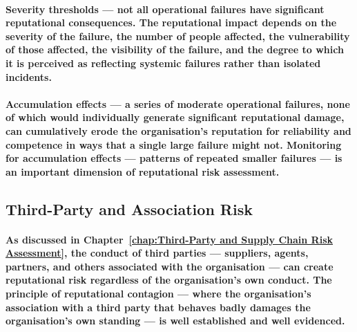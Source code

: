 \paragraph{\textbf{Severity thresholds} — not all operational failures have significant reputational consequences. The reputational impact depends on the severity of the failure, the number of people affected, the vulnerability of those affected, the visibility of the failure, and the degree to which it is perceived as reflecting systemic failures rather than isolated incidents.}
\paragraph{\textbf{Accumulation effects} — a series of moderate operational failures, none of which would individually generate significant reputational damage, can cumulatively erode the organisation's reputation for reliability and competence in ways that a single large failure might not. Monitoring for accumulation effects — patterns of repeated smaller failures — is an important dimension of reputational risk assessment.}

\subsection{Third-Party and Association Risk}
\paragraph{As discussed in Chapter~\ref{chap:Third-Party and Supply Chain Risk Assessment}, the conduct of third parties — suppliers, agents, partners, and others associated with the organisation — can create reputational risk regardless of the organisation's own conduct. The principle of reputational contagion — where the organisation's association with a third party that behaves badly damages the organisation's own standing — is well established and well evidenced.}
